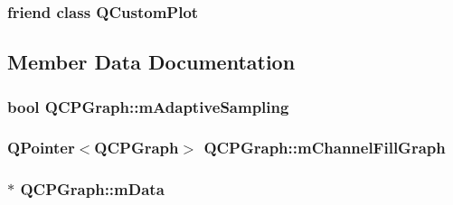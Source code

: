 \subsubsection[{Q\+Custom\+Plot}]{\setlength{\rightskip}{0pt plus 5cm}friend class {\bf Q\+Custom\+Plot}\hspace{0.3cm}{\ttfamily [friend]}}\label{class_q_c_p_graph_a1cdf9df76adcfae45261690aa0ca2198}


\subsection{Member Data Documentation}
\hypertarget{class_q_c_p_graph_aa951e78aeba714cf443be6da2e52502e}{}
\subsubsection[{m\+Adaptive\+Sampling}]{\setlength{\rightskip}{0pt plus 5cm}bool Q\+C\+P\+Graph\+::m\+Adaptive\+Sampling\hspace{0.3cm}{\ttfamily [protected]}}\label{class_q_c_p_graph_aa951e78aeba714cf443be6da2e52502e}
\hypertarget{class_q_c_p_graph_a2f1777c7accf8244fc640c33f0b04577}{}
\subsubsection[{m\+Channel\+Fill\+Graph}]{\setlength{\rightskip}{0pt plus 5cm}Q\+Pointer$<${\bf Q\+C\+P\+Graph}$>$ Q\+C\+P\+Graph\+::m\+Channel\+Fill\+Graph\hspace{0.3cm}{\ttfamily [protected]}}\label{class_q_c_p_graph_a2f1777c7accf8244fc640c33f0b04577}
\hypertarget{class_q_c_p_graph_a8457c840f69a0ac49f61d30a509c5d08}{}
\subsubsection[{m\+Data}]{$\ast$ Q\+C\+P\+Graph\+::m\+Data\hspace{0.3cm}{\ttfamily [protected]}}\label{class_q_c_p_graph_a8457c840f69a0ac49f61d30a509c5d08}
\hypertarget{class_q_c_p_graph_a7b51c8d09510f9d195b5e765ccbcf05b}{}
